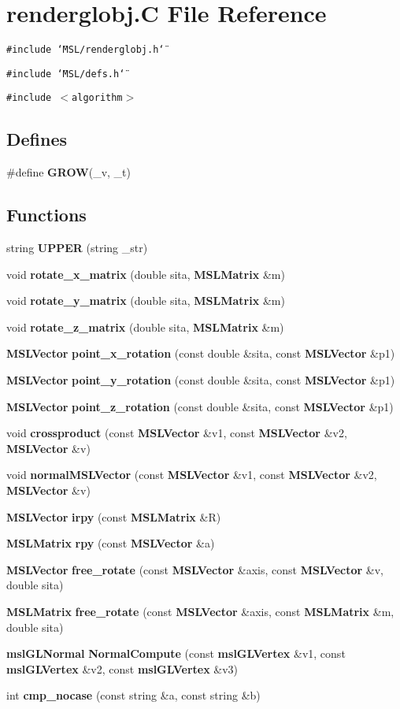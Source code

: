 \section{renderglobj.C File Reference}
\label{renderglobj_8C}
{\tt \#include \char`\"{}MSL/renderglobj.h\char`\"{}}\par
{\tt \#include \char`\"{}MSL/defs.h\char`\"{}}\par
{\tt \#include $<$algorithm$>$}\par
\subsection*{Defines}
\begin{CompactItemize}
\item 
\#define {\bf GROW}(\_\-v, \_\-t)
\end{CompactItemize}
\subsection*{Functions}
\begin{CompactItemize}
\item 
string {\bf UPPER} (string \_\-str)
\item 
void {\bf rotate\_\-x\_\-matrix} (double sita, {\bf MSLMatrix} \&m)
\item 
void {\bf rotate\_\-y\_\-matrix} (double sita, {\bf MSLMatrix} \&m)
\item 
void {\bf rotate\_\-z\_\-matrix} (double sita, {\bf MSLMatrix} \&m)
\item 
{\bf MSLVector} {\bf point\_\-x\_\-rotation} (const double \&sita, const {\bf MSLVector} \&p1)
\item 
{\bf MSLVector} {\bf point\_\-y\_\-rotation} (const double \&sita, const {\bf MSLVector} \&p1)
\item 
{\bf MSLVector} {\bf point\_\-z\_\-rotation} (const double \&sita, const {\bf MSLVector} \&p1)
\item 
void {\bf crossproduct} (const {\bf MSLVector} \&v1, const {\bf MSLVector} \&v2, {\bf MSLVector} \&v)
\item 
void {\bf normal\-MSLVector} (const {\bf MSLVector} \&v1, const {\bf MSLVector} \&v2, {\bf MSLVector} \&v)
\item 
{\bf MSLVector} {\bf irpy} (const {\bf MSLMatrix} \&R)
\item 
{\bf MSLMatrix} {\bf rpy} (const {\bf MSLVector} \&a)
\item 
{\bf MSLVector} {\bf free\_\-rotate} (const {\bf MSLVector} \&axis, const {\bf MSLVector} \&v, double sita)
\item 
{\bf MSLMatrix} {\bf free\_\-rotate} (const {\bf MSLVector} \&axis, const {\bf MSLMatrix} \&m, double sita)
\item 
{\bf msl\-GLNormal} {\bf Normal\-Compute} (const {\bf msl\-GLVertex} \&v1, const {\bf msl\-GLVertex} \&v2, const {\bf msl\-GLVertex} \&v3)
\item 
int {\bf cmp\_\-nocase} (const string \&a, const string \&b)
\end{CompactItemize}


